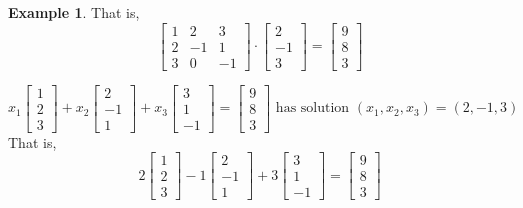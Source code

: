 \documentclass[12pt,letterpaper]{article}
\newcommand{\0}{{\bf 0}}
\theoremstyle{plain}
\theoremstyle{definition}
\newtheorem{example}{Example}
\begin{document}
\begin{example}
That is,
\[ 
\begin{bmatrix}
1& 2 & 3 \\
2& -1 & 1\\
3 & 0 & -1
\end{bmatrix}\cdot\begin{bmatrix}2\\-1\\3\end{bmatrix}=\begin{bmatrix}9\\8\\3\end{bmatrix}
\]

\[
x_1\begin{bmatrix}1 \\ 2 \\3
\end{bmatrix}
+x_2\begin{bmatrix}2 \\ -1\\1
\end{bmatrix}
+x_3\begin{bmatrix}3 \\ 1 \\-1
\end{bmatrix}=
\begin{bmatrix}9 \\ 8 \\ 3\end{bmatrix} \text{ has solution }(x_1,x_2,x_3)=(2, -1 , 3)
\]
That is, 
\[
2\begin{bmatrix}1 \\ 2 \\3
\end{bmatrix}
-1\begin{bmatrix}2 \\ -1\\1
\end{bmatrix}
+3\begin{bmatrix}3 \\ 1 \\-1
\end{bmatrix}=
\begin{bmatrix}9 \\ 8 \\ 3\end{bmatrix}
\]
\end{example}
\end{document}
